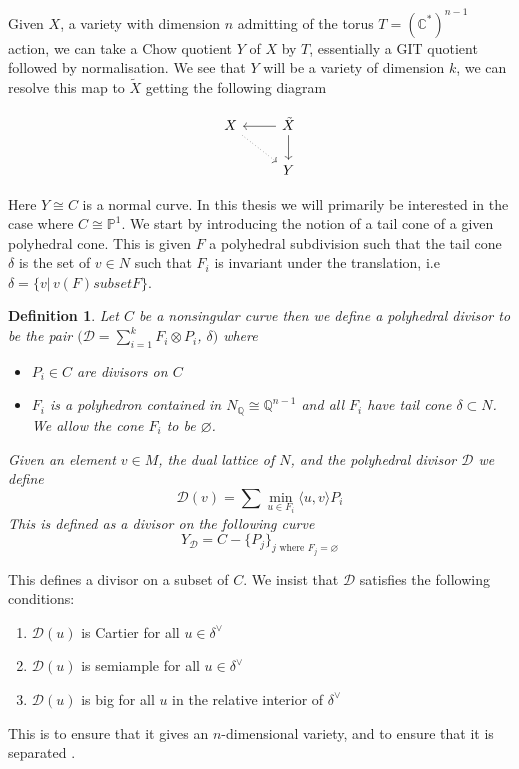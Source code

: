 \documentclass[12pt,a4paper]{book}      %
\newtheorem{dfn}[thm]{Definition}
\begin{document}
Given $X$, a variety with dimension $n$ admitting of the torus $ T = (\mathbb{C}^*)^{n-1}$ action, we can take a Chow quotient $Y$ of $X$ by $T$, essentially a GIT quotient followed by normalisation.  We see that $Y$ will be a variety of dimension $k$, we can resolve this map to $\tilde{X}$ getting the following diagram

\[
\begin{tikzcd}
X \arrow[rd, dotted] & \tilde{X} \arrow[l] \arrow[d]\\
& Y
\end{tikzcd}
\]

Here $Y \cong C$ is a normal curve. In this thesis we will primarily be interested in the case where $C \cong \mathbb{P}^1$. We start by introducing the notion of a tail cone of a given polyhedral cone. This is given $F$ a polyhedral subdivision such that the tail cone $\delta$ is the set of $v \in N$ such that $F_i$ is invariant under the translation, i.e $\delta = \{ v |\, v(F) subset F \}$.
\begin{dfn}
Let $C$ be a nonsingular curve then we define a polyhedral divisor to be the pair $(\mathcal{D} = \sum_{i = 1}^k F_i \otimes P_i$, $\delta)$ where
\begin{itemize}
\item $P_i \in C$ are divisors on $C$ 
\item $F_i$ is a polyhedron contained in $N_\mathbb{Q} \cong \mathbb{Q}^{n-1}$ and all $F_i$ have tail cone $\delta \subset N$.  We allow the cone $F_i$ to be $\varnothing$.
\end{itemize}
Given an element $v \in M$, the dual lattice of $N$, and the polyhedral divisor $\mathcal{D}$ we define
\[
\mathcal{D}(v) = \sum \min_{u \in F_i} \langle u, v \rangle P_i
\]
This is defined as a divisor on the following curve
\[
Y_\mathcal{D} = C - \{P_j\}_{j \text{ where } F_j = \varnothing}
\]
\end{dfn}

This defines a divisor on a subset of $C$. We insist that $\mathcal{D}$ satisfies the following conditions:
\begin{enumerate} 
\item $\mathcal{D}(u)$ is Cartier for all $u \in \delta^\vee $
\item $\mathcal{D}(u)$ is semiample for all $u \in \delta^\vee$
\item $\mathcal{D}(u)$ is big for all $u$ in the relative interior of $\delta^\vee$
\end{enumerate}
This is to ensure that it gives an $n$-dimensional variety, and to ensure that it is separated \cite{PS}.
\end{document}
